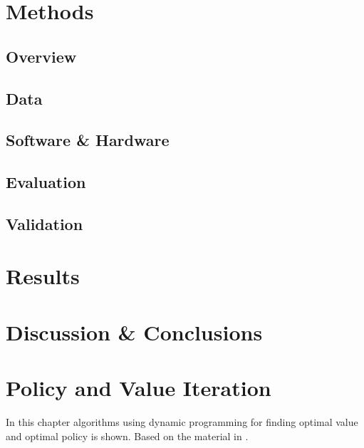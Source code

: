 \documentclass{kththesis}
\theoremstyle{definition}
\begin{document}
\chapter{Methods}

\section{Overview}

\section{Data}

\section{Software \& Hardware}

\section{Evaluation}

\section{Validation}

\chapter{Results}

\chapter{Discussion \& Conclusions}

\printbibliography[heading=bibintoc] %

\appendix 


\chapter{Policy and Value Iteration}\label{app:A}
In this chapter algorithms using dynamic programming for finding optimal value and optimal policy is shown. Based on the material in \parencite{sutton1998reinforcement}.
\end{document}

